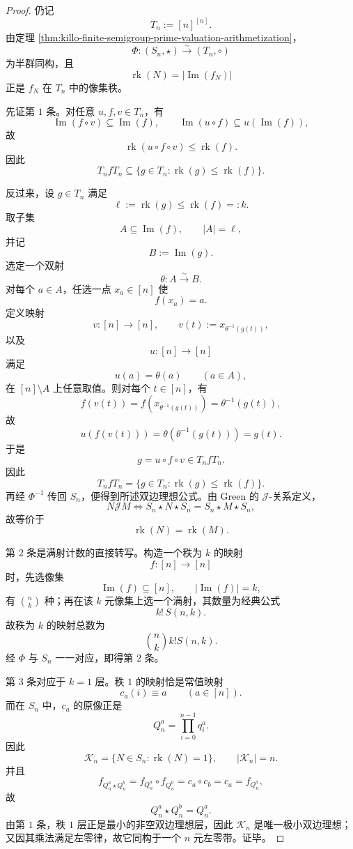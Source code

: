 \begin{proof}
仍记
\[
T_n:=[n]^{[n]}.
\]
由定理 \ref{thm:killo-finite-semigroup-prime-valuation-arithmetization}，
\[
\Phi:(S_n,\star)\xrightarrow{\sim}(T_n,\circ)
\]
为半群同构，且
\[
\operatorname{rk}(N)=|\operatorname{Im}(f_N)|
\]
正是 \(f_N\) 在 \(T_n\) 中的像集秩。

先证第 \(1\) 条。对任意 \(u,f,v\in T_n\)，有
\[
\operatorname{Im}(f\circ v)\subseteq \operatorname{Im}(f),
\qquad
\operatorname{Im}(u\circ f)\subseteq u(\operatorname{Im}(f)),
\]
故
\[
\operatorname{rk}(u\circ f\circ v)\le \operatorname{rk}(f).
\]
因此
\[
T_n f T_n\subseteq \{g\in T_n:\operatorname{rk}(g)\le \operatorname{rk}(f)\}.
\]

反过来，设 \(g\in T_n\) 满足
\[
\ell:=\operatorname{rk}(g)\le \operatorname{rk}(f)=:k.
\]
取子集
\[
A\subseteq \operatorname{Im}(f),
\qquad
|A|=\ell,
\]
并记
\[
B:=\operatorname{Im}(g).
\]
选定一个双射
\[
\theta:A\xrightarrow{\sim}B.
\]
对每个 \(a\in A\)，任选一点 \(x_a\in[n]\) 使
\[
f(x_a)=a.
\]
定义映射
\[
v:[n]\to[n],
\qquad
v(t):=x_{\theta^{-1}(g(t))},
\]
以及
\[
u:[n]\to[n]
\]
满足
\[
u(a)=\theta(a)\qquad (a\in A),
\]
在 \([n]\setminus A\) 上任意取值。则对每个 \(t\in[n]\)，有
\[
f(v(t))
=
f(x_{\theta^{-1}(g(t))})
=
\theta^{-1}(g(t)),
\]
故
\[
u(f(v(t)))=\theta(\theta^{-1}(g(t)))=g(t).
\]
于是
\[
g=u\circ f\circ v\in T_n f T_n.
\]
因此
\[
T_n f T_n=\{g\in T_n:\operatorname{rk}(g)\le \operatorname{rk}(f)\}.
\]
再经 \(\Phi^{-1}\) 传回 \(S_n\)，便得到所述双边理想公式。由 Green 的 \(\mathcal J\)-关系定义，
\[
N\mathrel{\mathcal J}M
\iff
S_n\star N\star S_n=S_n\star M\star S_n,
\]
故等价于
\[
\operatorname{rk}(N)=\operatorname{rk}(M).
\]

第 \(2\) 条是满射计数的直接转写。构造一个秩为 \(k\) 的映射
\[
f:[n]\to[n]
\]
时，先选像集
\[
\operatorname{Im}(f)\subseteq[n],
\qquad
|\operatorname{Im}(f)|=k,
\]
有 \(\binom{n}{k}\) 种；再在该 \(k\) 元像集上选一个满射，其数量为经典公式
\[
k!\,S(n,k).
\]
故秩为 \(k\) 的映射总数为
\[
\binom{n}{k}k!S(n,k).
\]
经 \(\Phi\) 与 \(S_n\) 一一对应，即得第 \(2\) 条。

第 \(3\) 条对应于 \(k=1\) 层。秩 \(1\) 的映射恰是常值映射
\[
c_a(i)\equiv a
\qquad
(a\in[n]).
\]
而在 \(S_n\) 中，\(c_a\) 的原像正是
\[
Q_n^a=\prod_{i=0}^{n-1}q_i^a.
\]
因此
\[
\mathcal K_n=\{N\in S_n:\operatorname{rk}(N)=1\},
\qquad
|\mathcal K_n|=n.
\]
并且
\[
f_{Q_n^a\star Q_n^b}
=
f_{Q_n^a}\circ f_{Q_n^b}
=
c_a\circ c_b
=
c_a
=
f_{Q_n^a},
\]
故
\[
Q_n^a\star Q_n^b=Q_n^a.
\]
由第 \(1\) 条，秩 \(1\) 层正是最小的非空双边理想层，因此 \(\mathcal K_n\) 是唯一极小双边理想；又因其乘法满足左零律，故它同构于一个 \(n\) 元左零带。证毕。
\end{proof}

\endinput
